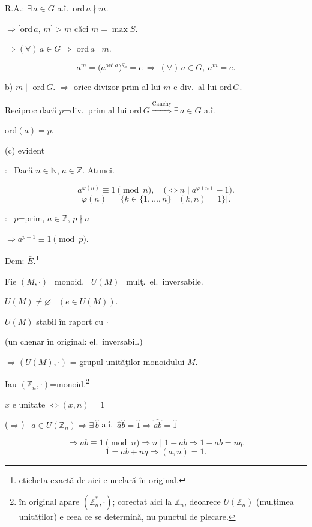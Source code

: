 \documentclass[12pt]{article}
\begin{document}
\noindent R.A.: $\exists\,a\in G$ a.î.\ ord$\,a\nmid m$.

\noindent $\Rightarrow \big[\text{ord}\,a,\,m\big] > m$ \quad căci $m=\max S$.

\bigskip
\noindent $\Rightarrow (\forall)\,a\in G \Rightarrow$ ord$\,a\mid m$.

\[
a^m = \big(a^{\text{ord}\,a}\big)^{q_a} = e \ \Rightarrow \ (\forall)\,a\in G,\ a^m=e.
\]

\bigskip
\noindent b) $m\mid$ ord$\,G$. $\Rightarrow$ orice divizor prim al lui $m$ e div.\ al lui ord$\,G$.

\noindent Reciproc dacă $p$=div.\ prim al lui ord$\,G \overset{\text{Cauchy}}{\Longrightarrow} \exists\,a\in G$ a.î.

\noindent ord$(a)=p$.

\bigskip
\noindent (c) evident

\bigskip
\noindent{}: \ Dacă $n\in\mathbb{N}$, $a\in\mathbb{Z}$. Atunci.

\[
a^{\varphi(n)} \equiv 1 \pmod n, \quad \big(\Leftrightarrow n\mid a^{\varphi(n)}-1\big).
\]
\[
\varphi(n) = \big|\{k\in\{1,\ldots,n\} \mid (k,n)=1\}\big|.
\]

\bigskip
\noindent{}: \ $p$=prim, $a\in\mathbb{Z}$, $p\nmid a$

\noindent $\Rightarrow a^{p-1}\equiv 1 \pmod p$.

\bigskip
\noindent\underline{Dem}: $\bar E$.\footnote{eticheta exactă de aici e neclară în original.}

\noindent Fie $(M,\cdot)$=monoid. \ $U(M)$=mulţ.\ el.\ inversabile.

\bigskip
\noindent $U(M)\neq\varnothing$ \ $(e\in U(M))$.

\noindent $U(M)$ stabil în raport cu $\cdot$

\noindent (un chenar în original: el.\ inversabil.)

\bigskip
\noindent $\Rightarrow (U(M),\cdot)$ = grupul unităţilor monoidului $M$.

\bigskip
\noindent Iau $(\mathbb{Z}_n,\cdot)$=monoid.\footnote{în original apare $(\mathbb{Z}_n^*,\cdot)$; corectat aici la $\mathbb{Z}_n$, deoarece $U(\mathbb{Z}_n)$ (mulțimea unităților) e ceea ce se determină, nu punctul de plecare.}

\bigskip
\noindent $\hat x$ e unitate $\Leftrightarrow (x,n)=1$

\bigskip
\noindent ($\Rightarrow$) \ $\hat a\in U(\mathbb{Z}_n) \Rightarrow \exists\,\hat b$ a.î.\ $\hat a\hat b=\hat 1 \Rightarrow \widehat{ab}=\hat 1$

\[
\Rightarrow ab\equiv 1 \pmod n \Rightarrow n\mid 1-ab \Rightarrow 1-ab=nq.
\]
\[
1=ab+nq \Rightarrow (a,n)=1.
\]
\end{document}

